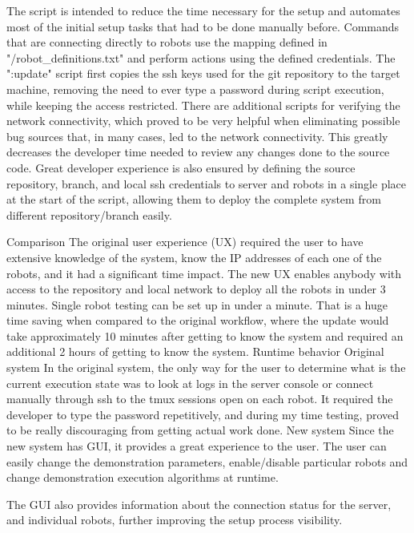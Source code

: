 The script is intended to reduce the time necessary for the setup and automates most of the initial setup tasks that had to be done manually before. \br
Commands that are connecting directly to robots use the mapping defined in "/robot_definitions.txt" and perform actions using the defined credentials. \br The ":update" script first copies the ssh keys used for the git repository to the target machine, removing the need to ever type a password during script execution, while keeping the access restricted.\br
There are additional scripts for verifying the network connectivity, which proved to be very helpful when eliminating possible bug sources that, in many cases, led to the network connectivity. \br
This greatly decreases the developer time needed to review any changes done to the source code. Great developer experience is also ensured by defining the source repository, branch, and local ssh credentials to server and robots in a single place at the start of the script, allowing them to deploy the complete system from different repository/branch easily.

\secc Comparison
The original user experience (UX) required the user to have extensive knowledge of the system, know the IP addresses of each one of the robots, and it had a significant time impact. The new UX enables anybody with access to the repository and local network to deploy all the robots in under 3 minutes. Single robot testing can be set up in under a minute. That is a huge time saving when compared to the original workflow, where the update would take approximately 10 minutes after getting to know the system and required an additional 2 hours of getting to know the system.
\sec Runtime behavior
\secc Original system
In the original system, the only way for the user to determine what is the current execution state was to look at logs in the server console or connect manually through ssh to the tmux sessions open on each robot. It required the developer to type the password repetitively, and during my time testing, proved to be really discouraging from getting actual work done.
\secc New system
Since the new system has GUI, it provides a great experience to the user. The user can easily change the demonstration parameters, enable/disable particular robots and change demonstration execution algorithms at runtime.

The GUI also provides information about the connection status for the server, and individual robots, further improving the setup process visibility.

